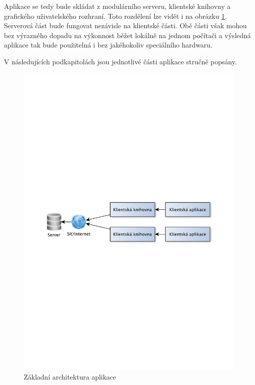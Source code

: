 Aplikace se tedy bude skládat z modulárního serveru, klientské knihovny a grafického uživatelského rozhraní.
Toto rozdělení lze vidět i na obrázku \ref{fig:architektura}.
Serverová část bude fungovat nezávisle na klientské části. Obě části však mohou bez výrazného dopadu 
na výkonnost běžet lokálně na jednom počítači a výsledná aplikace tak bude použitelná i bez
jakéhokoliv speciálního hardwaru.

V následujících podkapitolách jsou jednotlivé části aplikace stručně popsány.

\begin{figure}[h]
\centering
\includegraphics[trim=12cm 12cm 12cm 12cm, scale=0.8]{fig/princip}
\caption{Základní architektura aplikace} %
\label{fig:architektura}
\end{figure}

